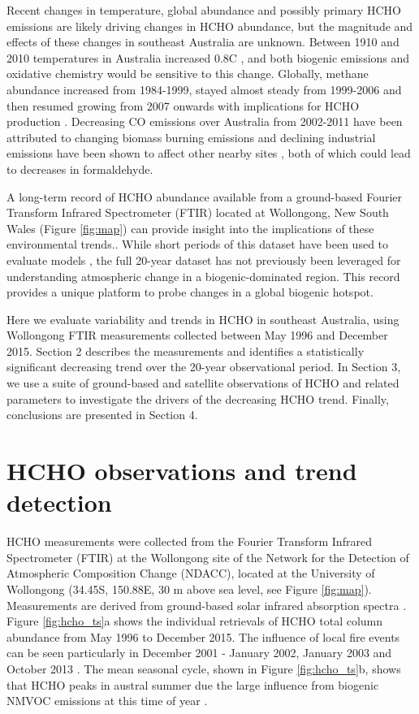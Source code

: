 \documentclass[draft,linenumbers]{AGUJournal}
\begin{document}
Recent changes in temperature, global  abundance and possibly primary HCHO emissions are likely driving changes in HCHO abundance, but the magnitude and effects of these changes in southeast Australia are unknown. Between 1910 and 2010 temperatures in Australia increased 0.8\degree C \citep{ABS2012}, and both biogenic emissions and oxidative chemistry would be sensitive to this change. Globally, methane abundance increased from 1984-1999, stayed almost steady from 1999-2006 and then resumed growing from 2007 onwards \citep{Nisbet2014} with implications for HCHO production \citep{Franco2016}. Decreasing CO emissions over Australia from 2002-2011 have been attributed to changing biomass burning emissions \citet{Yin2015} and declining industrial emissions have been shown to affect other nearby sites \citep{Zeng2012}, both of which could lead to decreases in formaldehyde.

A long-term record of HCHO abundance available from a ground-based Fourier Transform Infrared Spectrometer (FTIR) located at Wollongong, New South Wales (Figure \ref{fig:map}) can provide insight into the implications of these environmental trends.. While short periods of this dataset have been used to evaluate models \citep{Zeng2015}, the full 20-year dataset has not previously been leveraged for understanding atmospheric change in a biogenic-dominated region. This record provides a unique platform to probe changes in a global biogenic hotspot.

Here we evaluate variability and trends in HCHO in southeast Australia, using Wollongong FTIR measurements collected between May 1996 and December 2015. Section 2 describes the measurements and identifies a statistically significant decreasing trend over the 20-year observational period. In Section 3, we use a suite of ground-based and satellite observations of HCHO and related parameters to investigate the drivers of the decreasing HCHO trend. Finally, conclusions are presented in Section 4.

\section{HCHO observations and trend detection}

HCHO measurements were collected from the Fourier Transform Infrared Spectrometer (FTIR) at the Wollongong site of the Network for the Detection of Atmospheric Composition Change (NDACC), located at the University of Wollongong (34.45\degree S, 150.88\degree E, 30 m above sea level, see Figure \ref{fig:map}). Measurements are derived from ground-based solar infrared absorption spectra \citep{Griffith1998,Te2016}. Figure \ref{fig:hcho_ts}a shows the individual retrievals of HCHO total column abundance from May 1996 to December 2015. The influence of local fire events can be seen particularly in December 2001 - January 2002, January 2003 and October 2013 \citep{Paton-Walsh2004,Paton-Walsh2005,Paton-Walsh2010,Rea2016}. The mean seasonal cycle, shown in Figure \ref{fig:hcho_ts}b, shows that HCHO peaks in austral summer due the large influence from biogenic NMVOC emissions at this time of year \citep{Jones2009,Zeng2012}.
\end{document}
